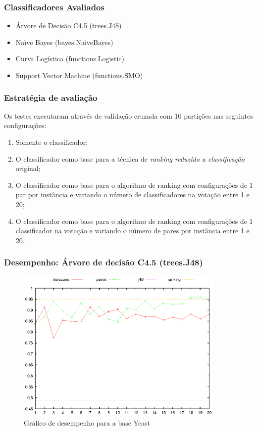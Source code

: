 \begin{frame}
    \frametitle{Classificadores Avaliados}
    
    \begin{itemize}
        \item Árvore de Decisão C4.5 (trees.J48)
        \item Naïve Bayes (bayes.NaiveBayes)
        \item Curva Logística (functions.Logistic)
        \item Support Vector Machine (functions.SMO)
    \end{itemize}
\end{frame}

\begin{frame}
    \frametitle{Estratégia de avaliação}

    Os testes executaram através de validação cruzada com 10 partições nas seguintes configurações:

    \begin{enumerate}
        \item Somente o classificador;
        \item O classificador como base para a técnica de \emph{ranking reduzido a classificação} original;
        \item O classificador como base para o algoritmo de ranking com configurações de 1 par por instância e variando o número de classificadores na votação entre 1 e 20;
        \item O classificador como base para o algoritmo de ranking com configurações de 1 classificador na votação e variando o número de pares por instância entre 1 e 20.
    \end{enumerate}
\end{frame}

\begin{frame}
    \frametitle{Desempenho: Árvore de decisão C4.5 (trees.J48)}

    \begin{figure}[H]
        \centering
        \includegraphics[width=0.9\textwidth]{img/yeast_j48.eps}
        \caption{Gráfico de desempenho para a base Yeast}
    \end{figure}
\end{frame}

